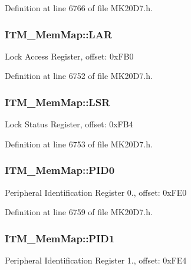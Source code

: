 Definition at line 6766 of file M\+K20\+D7.\+h.

\subsubsection[{\texorpdfstring{L\+AR}{LAR}}]{ I\+T\+M\+\_\+\+Mem\+Map\+::\+L\+AR}\hypertarget{struct_i_t_m___mem_map_af3f0dfff8c586620bdb0026aca56fe05}{}\label{struct_i_t_m___mem_map_af3f0dfff8c586620bdb0026aca56fe05}
Lock Access Register, offset\+: 0x\+F\+B0 

Definition at line 6752 of file M\+K20\+D7.\+h.

\subsubsection[{\texorpdfstring{L\+SR}{LSR}}]{ I\+T\+M\+\_\+\+Mem\+Map\+::\+L\+SR}\hypertarget{struct_i_t_m___mem_map_a8ecbf568728eeaac07edd3774a4dbd9f}{}\label{struct_i_t_m___mem_map_a8ecbf568728eeaac07edd3774a4dbd9f}
Lock Status Register, offset\+: 0x\+F\+B4 

Definition at line 6753 of file M\+K20\+D7.\+h.

\subsubsection[{\texorpdfstring{P\+I\+D0}{PID0}}]{ I\+T\+M\+\_\+\+Mem\+Map\+::\+P\+I\+D0}\hypertarget{struct_i_t_m___mem_map_a33d99fb4c1d69a6ca62e0e3442f07a95}{}\label{struct_i_t_m___mem_map_a33d99fb4c1d69a6ca62e0e3442f07a95}
Peripheral Identification Register 0., offset\+: 0x\+F\+E0 

Definition at line 6759 of file M\+K20\+D7.\+h.

\subsubsection[{\texorpdfstring{P\+I\+D1}{PID1}}]{ I\+T\+M\+\_\+\+Mem\+Map\+::\+P\+I\+D1}\hypertarget{struct_i_t_m___mem_map_a7de8ee5b7f467a00ac6c7290c93b39a8}{}\label{struct_i_t_m___mem_map_a7de8ee5b7f467a00ac6c7290c93b39a8}
Peripheral Identification Register 1., offset\+: 0x\+F\+E4 

